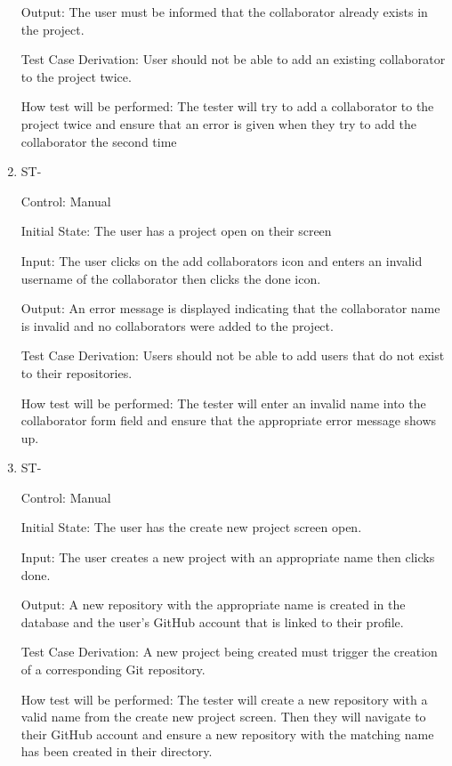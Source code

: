 \documentclass[12pt, titlepage]{article}
\newcounter{TESTID}
\newcommand\TESTNUM{\stepcounter{TESTID}\theTESTID}
\begin{document}
\begin{enumerate}
		Output: The user must be informed that the collaborator already exists in the project.
		
		Test Case Derivation: User should not be able to add an existing collaborator to the project twice.
		
		How test will be performed: The tester will try to add a collaborator to the project twice and ensure that an error is given when they try to add the collaborator the second time
		
		\item{ST-\TESTNUM\\}
		
		Control: Manual
		
		Initial State: The user has a project open on their screen
		
		Input: The user clicks on the add collaborators icon and enters an invalid username of the collaborator then clicks the done icon.
		
		Output: An error message is displayed indicating that the collaborator name is invalid and no collaborators were added to the project.
		
		Test Case Derivation: Users should not be able to add users that do not exist to their repositories.
		
		How test will be performed: The tester will enter an invalid name into the collaborator form field and ensure that the appropriate error message shows up.
		
		\item{ST-\TESTNUM\\}
		
		Control: Manual
		
		Initial State: The user has the create new project screen open.
		
		Input: The user creates a new project with an appropriate name then clicks done.
		
		Output: A new repository with the appropriate name is created in the database and the user's GitHub account that is linked to their profile. 
		
		Test Case Derivation: A new project being created must trigger the creation of a corresponding Git repository.
		
		How test will be performed: The tester will create a new repository with a valid name from the create new project screen. Then they will navigate to their GitHub account and ensure a new repository with the matching name has been created in their directory.
		

\end{enumerate}
\end{document}
